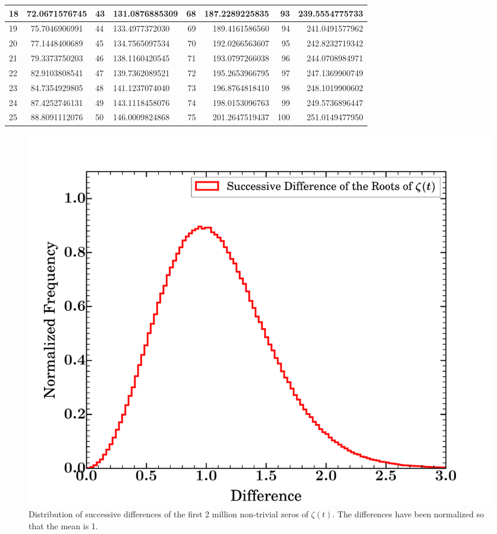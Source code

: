 \documentclass{amsproc}
\theoremstyle{definition}
\theoremstyle{remark}
\numberwithin{equation}{section}
\begin{document}
\begin{center}
\begin{tabular}{ | l | c || l | l || r | r || r | r | }
    18 & 72.0671576745  & 43 & 131.0876885309  & 68 & 187.2289225835  & 93 & 239.5554775733  \\ \hline 
    19 & 75.7046906991  & 44 & 133.4977372030  & 69 & 189.4161586560  & 94 & 241.0491577962  \\ \hline 
    20 & 77.1448400689  & 45 & 134.7565097534  & 70 & 192.0266563607  & 95 & 242.8232719342  \\ \hline 
    21 & 79.3373750203  & 46 & 138.1160420545  & 71 & 193.0797266038  & 96 & 244.0708984971  \\ \hline 
    22 & 82.9103808541  & 47 & 139.7362089521  & 72 & 195.2653966795  & 97 & 247.1369900749  \\ \hline 
    23 & 84.7354929805  & 48 & 141.1237074040  & 73 & 196.8764818410  & 98 & 248.1019900602  \\ \hline 
    24 & 87.4252746131  & 49 & 143.1118458076  & 74 & 198.0153096763  & 99 & 249.5736896447  \\ \hline 
    25 & 88.8091112076  & 50 & 146.0009824868  & 75 & 201.2647519437  & 100 & 251.0149477950  \\
    \hline
  \end{tabular}
\label{tab:first_100_roots}
\end{center}

\begin{figure}
\includegraphics[width=\columnwidth]{figures/zeta_zeros_normalized_differences.pdf}
\caption{Distribution of successive differences of the first 2 million non-trivial zeros of $\zeta(t)$. The differences have been normalized so that the mean is 1.}
\label{fig:zeta_zeros_normalized_differences}
\end{figure}
\end{document}
